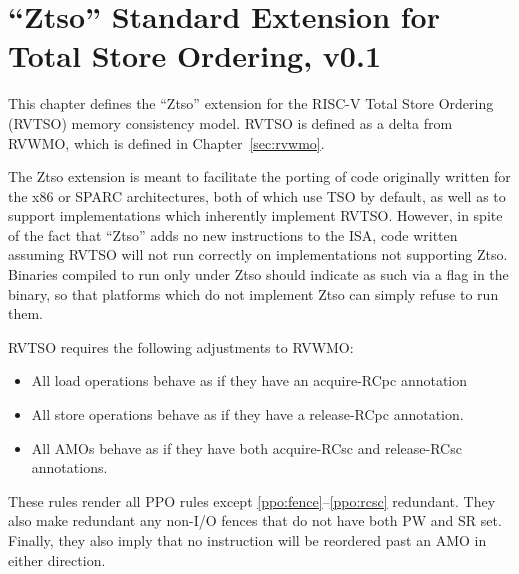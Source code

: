 \chapter{``Ztso'' Standard Extension for Total Store Ordering, v0.1}
\label{sec:ztso}

This chapter defines the ``Ztso'' extension for the RISC-V Total Store Ordering (RVTSO) memory consistency model.
RVTSO is defined as a delta from RVWMO, which is defined in Chapter~\ref{sec:rvwmo}.

\begin{commentary}
  The Ztso extension is meant to facilitate the porting of code originally written for the x86 or SPARC architectures, both of which use TSO by default, as well as to support implementations which inherently implement RVTSO.
  However, in spite of the fact that ``Ztso'' adds no new instructions to the ISA, code written assuming RVTSO will not run correctly on implementations not supporting Ztso.
  Binaries compiled to run only under Ztso should indicate as such via a flag in the binary, so that platforms which do not implement Ztso can simply refuse to run them.
\end{commentary}

RVTSO requires the following adjustments to RVWMO:

\begin{itemize}
  \item All load operations behave as if they have an acquire-RCpc annotation
  \item All store operations behave as if they have a release-RCpc annotation.
  \item All AMOs behave as if they have both acquire-RCsc and release-RCsc annotations.
\end{itemize}

These rules render all PPO rules except \ref{ppo:fence}--\ref{ppo:rcsc} redundant.
They also make redundant any non-I/O fences that do not have both PW and SR set.
Finally, they also imply that no instruction will be reordered past an AMO in either direction.
